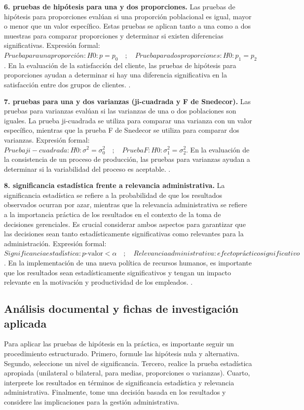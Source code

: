 {\textbf{6. pruebas de hipótesis para una y dos proporciones.} Las pruebas de hipótesis para proporciones evalúan si una proporción poblacional es igual, mayor o menor que un valor específico. Estas pruebas se aplican tanto a una como a dos muestras para comparar proporciones y determinar si existen diferencias significativas. Expresión formal: $Prueba para una proporción: H0: p = p_0  \quad ; \quad Prueba para dos proporciones: H0: p_1 = p_2$. En la evaluación de la satisfacción del cliente, las pruebas de hipótesis para proporciones ayudan a determinar si hay una diferencia significativa en la satisfacción entre dos grupos de clientes. \citep{anderson2012,lind2012,wackerly2010}.

\textbf{7. pruebas para una y dos varianzas (ji-cuadrada y F de Snedecor).} Las pruebas para varianzas evalúan si las varianzas de una o dos poblaciones son iguales. La prueba ji-cuadrada se utiliza para comparar una varianza con un valor específico, mientras que la prueba F de Snedecor se utiliza para comparar dos varianzas. Expresión formal: $Prueba ji-cuadrada: H0: \sigma^2 = \sigma_0^2  \quad ; \quad Prueba F: H0: \sigma_1^2 = \sigma_2^2$. En la evaluación de la consistencia de un proceso de producción, las pruebas para varianzas ayudan a determinar si la variabilidad del proceso es aceptable. \citep{anderson2012,lind2012,wackerly2010}.

\textbf{8. significancia estadística frente a relevancia administrativa.} La significancia estadística se refiere a la probabilidad de que los resultados observados ocurran por azar, mientras que la relevancia administrativa se refiere a la importancia práctica de los resultados en el contexto de la toma de decisiones gerenciales. Es crucial considerar ambos aspectos para garantizar que las decisiones sean tanto estadísticamente significativas como relevantes para la administración. Expresión formal: $Significancia estadística: p\text{-valor} < \alpha  \quad ; \quad Relevancia administrativa: efecto práctico significativo$. En la implementación de una nueva política de recursos humanos, es importante que los resultados sean estadísticamente significativos y tengan un impacto relevante en la motivación y productividad de los empleados. \citep{anderson2012,lind2012,wackerly2010}.


\subsection{Análisis documental y fichas de investigación aplicada}
Para aplicar las pruebas de hipótesis en la práctica, es importante seguir un procedimiento estructurado. Primero, formule las hipótesis nula y alternativa. Segundo, seleccione un nivel de significancia. Tercero, realice la prueba estadística apropiada (unilateral o bilateral, para medias, proporciones o varianzas). Cuarto, interprete los resultados en términos de significancia estadística y relevancia administrativa. Finalmente, tome una decisión basada en los resultados y considere las implicaciones para la gestión administrativa.

}
